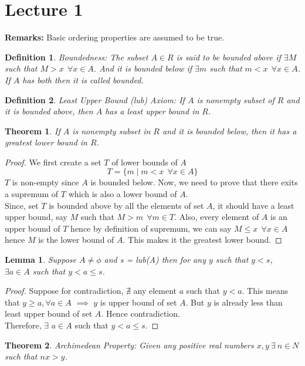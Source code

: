 \documentclass[12pt]{report}
\newtheorem{thm}{Theorem}
\newtheorem{lem}{Lemma}
\newtheorem{defn}{Definition}
\begin{document}
\section*{Lecture 1}
\textbf{Remarks:} Basic ordering properties are assumed to be true.
\begin{defn}
    Boundedness: The subset $A \in R$ is said to be bounded above if $\exists M$ such that $M > x~~ \forall x \in A$. And it is bounded below if $\exists m$ such that $m < x~~ \forall x \in A$. If $A$ has both then it is called bounded.   
\end{defn}
\begin{defn}
    Least Upper Bound (lub) Axiom: If $A$ is nonempty subset of $R$ and it is bounded above, then $A$ has a least upper bound in $R$.
\end{defn}
\begin{thm}
    If $A$ is nonempty subset in $R$ and it is bounded below, then it has a greatest lower bound in $R$.
\end{thm}
\begin{proof}
    We first create a set $T$ of lower bounds of $A$ $$ T = \{m \mid m < x~~\forall x \in A\}$$ $T$ is non-empty since $A$ is bounded below. Now, we need to prove that there exits a supremum of $T$ which is also a lower bound of $A$.\\
    Since, set $T$ is bounded above by all the elements of set $A$, it should have a least upper bound, say $M$ such that $ M > m~~ \forall m \in T$. Also, every element of $A$ is an upper bound of $T$ hence by definition of supremum, we can say $M \leq x~~ \forall x \in A$ hence $M$ is the lower bound of $A$. This makes it the greatest lower bound.
\end{proof}
\begin{lem}
    Suppose $A \neq \phi$ and s = lub(A) then for any $y$ such that $y < s$, $\exists a \in A$ such that $ y < a \leq s$.
\end{lem}
\begin{proof}
    Suppose for contradiction, $\nexists$ any element $a$ such that $ y < a$. This means that $y \geq a, \forall a \in A$ $\implies$ $y$ is upper bound of set $A$. But $y$ is already less than least upper bound of set $A$. Hence contradiction. \\
    Therefore, $\exists$ $a \in A$ such that $ y < a \leq s$.   
\end{proof} 
\begin{thm}
    Archimedean Property: Given any positive real numbers $x,y~\exists~n \in N$ such that $ nx > y$.
\end{thm}
\end{document}
